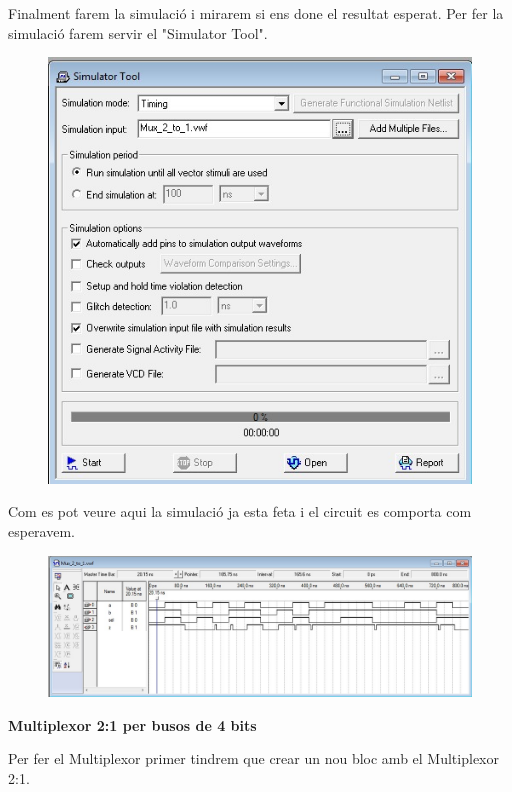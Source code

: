 \documentclass[12pt, a4papre]{article}
\begin{document}
	Finalment farem la simulació i mirarem si ens done el resultat esperat. Per fer la simulació farem servir el "Simulator Tool".
	\begin{figure}[H]
		\begin{center}
		\includegraphics[width=120mm]{finestrasimulacio.jpeg}
		\end{center}
	\end{figure}
	
	Com es pot veure aqui la simulació ja esta feta i el circuit es comporta com esperavem.
	\begin{figure}[H]
		\begin{center}
		\includegraphics[width=150mm]{simulaciofeta.jpeg}
		\end{center}
	\end{figure}
	
	\textbf{\large{Multiplexor 2:1 per busos de 4 bits}}
	
	Per fer el Multiplexor primer tindrem que crear un nou bloc amb el Multiplexor 2:1.
	
\end{document}
